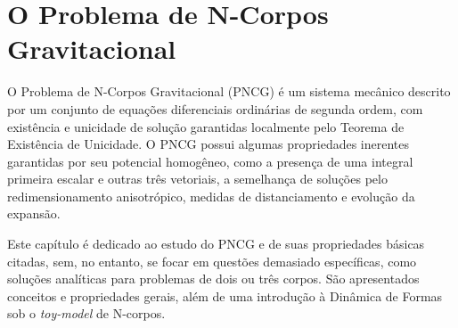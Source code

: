 
\chapter{O Problema de N-Corpos Gravitacional}\label{capitulo:pncg}

O Problema de N-Corpos Gravitacional (PNCG) é um sistema mecânico descrito por um conjunto de equações diferenciais ordinárias de segunda ordem, com existência e unicidade de solução garantidas localmente pelo Teorema de Existência de Unicidade. O PNCG possui algumas propriedades inerentes garantidas por seu potencial homogêneo, como a presença de uma integral primeira escalar e outras três vetoriais, a semelhança de soluções pelo redimensionamento anisotrópico, medidas de distanciamento e evolução da expansão.

Este capítulo é dedicado ao estudo do PNCG e de suas propriedades básicas citadas, sem, no entanto, se focar em questões demasiado específicas, como soluções analíticas para problemas de dois ou três corpos. São apresentados conceitos e propriedades gerais, além de uma introdução à Dinâmica de Formas sob o \textit{toy-model} de N-corpos.












